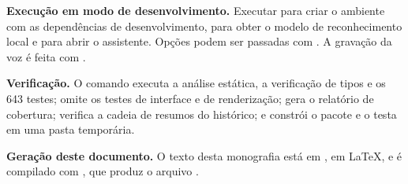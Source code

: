 \textbf{Execução em modo de desenvolvimento.} Executar  para criar o ambiente com as
dependências de desenvolvimento,  para obter o modelo de reconhecimento local
e  para abrir o assistente. Opções podem ser passadas com
. A gravação da voz é feita com .

\textbf{Verificação.} O comando  executa a análise estática, a verificação de tipos
e os 643 testes;  omite os testes de interface e de renderização;
 gera o relatório de cobertura;  verifica a cadeia de resumos
do histórico; e  constrói o pacote e o testa em uma pasta temporária.

\textbf{Geração deste documento.} O texto desta monografia está em , em LaTeX, e é
compilado com , que produz o arquivo .
